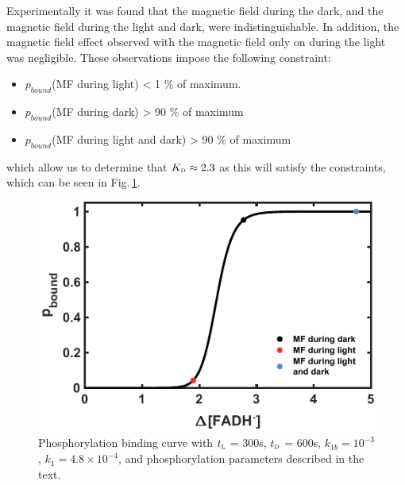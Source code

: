 \documentclass[twoside,twocolumn,9pt]{article}
\begin{document}
Experimentally it was found that the magnetic field during the dark, and the magnetic field during the light and dark, were 
indistinguishable. \cite{Pooam2019} In addition, the magnetic field effect observed with the magnetic field only on during the 
light was negligible. These observations impose the following constraint:
\begin{itemize}
	\item $p_{bound}$(MF during light) < 1 \% of maximum.
	\item $p_{bound}$(MF during dark) > 90 \% of maximum
	\item $p_{bound}$(MF during light and dark) > 90 \% of maximum
\end{itemize}
which allow us to determine that $K_{\textsc{d}} \approx 2.3$ as this will satisfy the constraints, which can be seen in 
Fig.\,\ref{fig:sigmoid}.
\begin{figure}[h]
	\centering
	\includegraphics{sigmoid.pdf}
	\caption{Phosphorylation binding curve with $t_{\textsc{l}}$ = 300s, $t_{\textsc{d}}$ = 600s, $k_{1b} = 10^{-3}$, $k_{1} = 4.8 
		\times 10^{-4}$, and phosphorylation parameters described in the text.}
	\label{fig:sigmoid}
\end{figure}
\end{document}
